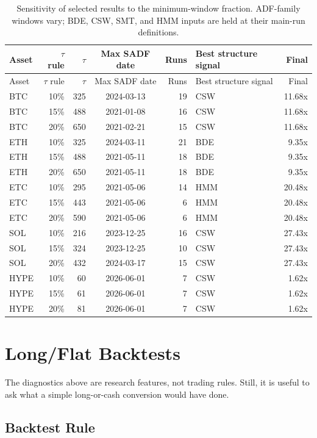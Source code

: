 \documentclass[11pt]{article}
\begin{document}
\begin{longtable}{@{}lrrcrlr@{}}
\caption{Sensitivity of selected results to the minimum-window fraction. ADF-family windows vary; BDE, CSW, SMT, and HMM inputs are held at their main-run definitions.}\\
\toprule
Asset & $\tau$ rule & $\tau$ & Max SADF date & Runs & Best structure signal & Final \\
\midrule
\endfirsthead
\toprule
Asset & $\tau$ rule & $\tau$ & Max SADF date & Runs & Best structure signal & Final \\
\midrule
\endhead
BTC & 10\% & 325 & 2024-03-13 & 19 & CSW & 11.68x \\
BTC & 15\% & 488 & 2021-01-08 & 16 & CSW & 11.68x \\
BTC & 20\% & 650 & 2021-02-21 & 15 & CSW & 11.68x \\
ETH & 10\% & 325 & 2024-03-11 & 21 & BDE & 9.35x \\
ETH & 15\% & 488 & 2021-05-11 & 18 & BDE & 9.35x \\
ETH & 20\% & 650 & 2021-05-11 & 18 & BDE & 9.35x \\
ETC & 10\% & 295 & 2021-05-06 & 14 & HMM & 20.48x \\
ETC & 15\% & 443 & 2021-05-06 & 6 & HMM & 20.48x \\
ETC & 20\% & 590 & 2021-05-06 & 6 & HMM & 20.48x \\
SOL & 10\% & 216 & 2023-12-25 & 16 & CSW & 27.43x \\
SOL & 15\% & 324 & 2023-12-25 & 10 & CSW & 27.43x \\
SOL & 20\% & 432 & 2024-03-17 & 15 & CSW & 27.43x \\
HYPE & 10\% & 60 & 2026-06-01 & 7 & CSW & 1.62x \\
HYPE & 15\% & 61 & 2026-06-01 & 7 & CSW & 1.62x \\
HYPE & 20\% & 81 & 2026-06-01 & 7 & CSW & 1.62x \\
\bottomrule
\end{longtable}

\section{Long/Flat Backtests}

The diagnostics above are research features, not trading rules. Still, it is useful to ask what a simple long-or-cash conversion would have done.

\subsection{Backtest Rule}
\end{document}
